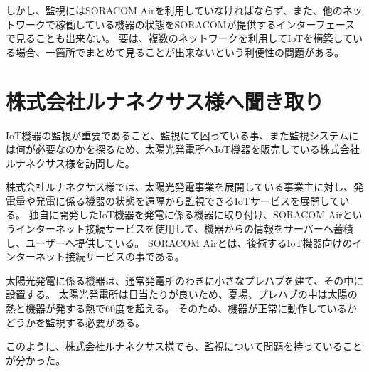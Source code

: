 しかし、監視にはSORACOM Airを利用していなければならず、また、他のネットワークで稼働している機器の状態をSORACOMが提供するインターフェースで見ることも出来ない。
要は、複数のネットワークを利用してIoTを構築している場合、一箇所でまとめて見ることが出来ないという利便性の問題がある。



\section{株式会社ルナネクサス様へ聞き取り}
IoT機器の監視が重要であること、監視にて困っている事、また監視システムには何が必要なのかを探るため、太陽光発電所へIoT機器を販売している株式会社ルナネクサス様を訪問した。

株式会社ルナネクサス様では、太陽光発電事業を展開している事業主に対し、発電量や発電に係る機器の状態を遠隔から監視できるIoTサービスを展開している。
独自に開発したIoT機器を発電に係る機器に取り付け、SORACOM Airというインターネット接続サービスを使用して、機器からの情報をサーバーへ蓄積し、ユーザーへ提供している。
SORACOM Airとは、後術するIoT機器向けのインターネット接続サービスの事である。

太陽光発電に係る機器は、通常発電所のわきに小さなプレハブを建て、その中に設置する。
太陽光発電所は日当たりが良いため、夏場、プレハブの中は太陽の熱と機器が発する熱で60度を超える。
そのため、機器が正常に動作しているかどうかを監視する必要がある。

このように、株式会社ルナネクサス様でも、監視について問題を持っていることが分かった。





